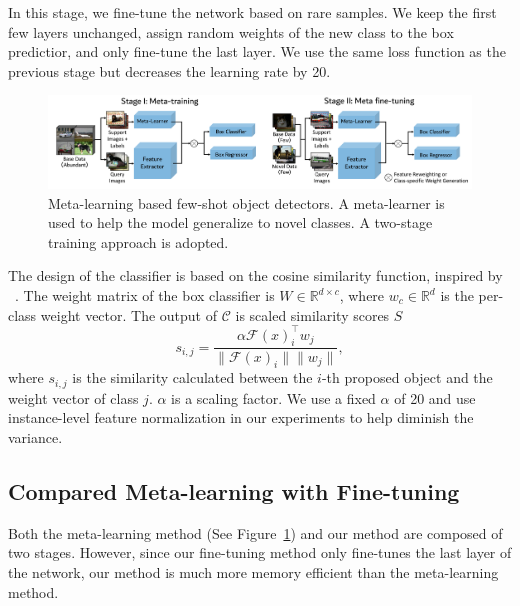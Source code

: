  In this stage, we fine-tune the network based on rare samples. We keep the first few layers unchanged, assign random weights of the new class to the box predictior, and only fine-tune the last layer. We use the same loss function as the previous stage but decreases the learning rate by 20.

\begin{figure}[ht]
    \centering
    \includegraphics[width=\linewidth]{figs/TFA_fig2.pdf}
    \vspace{-8mm}
    \caption{Meta-learning based few-shot object detectors. A meta-learner is used to help the model generalize to novel classes. A two-stage training approach is adopted.}
    \label{fig:meta_arch}
\end{figure}

 The design of the classifier is based on the cosine similarity function, inspired by ~\citet{gidaris2018dynamic,qi2018low,chen2019closer}.
The weight matrix of the box classifier is $W\in\mathbb{R}^{d\times c}$, where $w_c\in\mathbb{R}^d$ is the per-class weight vector. The output of $\mathcal{C}$ is scaled similarity scores $S$
\begin{equation}
    s_{i,j} = \frac{\alpha \mathcal{F}(x)_i^\top w_j}{\|\mathcal{F}(x)_i\| \|w_j\|},
    \label{eq:classifier} 
\end{equation}
where $s_{i,j}$ is the similarity calculated between the $i$-th proposed object and the weight vector of class $j$. $\alpha$ is a scaling factor. We use a fixed $\alpha$ of 20 and use instance-level feature normalization in our experiments to help diminish the variance.

\subsection{Compared Meta-learning with Fine-tuning}
\label{sec:meta}
Both the meta-learning method (See Figure~\ref{fig:meta_arch}) and our method are composed of two stages. However, since our fine-tuning method only fine-tunes the last layer of the network, our method is much more memory efficient than the meta-learning method.
